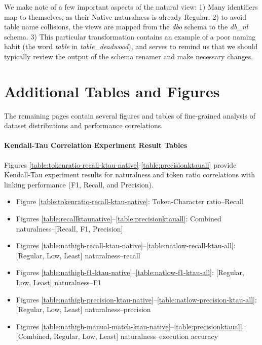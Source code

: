 We make note of a few important aspects of the natural view: 1) Many identifiers map to themselves, as their Native naturalness is already Regular. 2) to avoid table name collisions, the views are mapped from the \emph{dbo} schema to the \emph{db\_nl} schema. 3) This particular transformation contains an example of a poor naming habit (the word \emph{table} in \emph{table\_deadwood}), and serves to remind us that we should typically review the output of the schema renamer and make necessary changes.


\section{Additional Tables and Figures}


The remaining pages contain several figures and tables of fine-grained analysis of dataset distributions and performance correlations.

\paragraph{Kendall-Tau Correlation Experiment Result Tables}

Figures \ref{table:tokenratio-recall-ktau-native}-\ref{table:precisionktauall} provide Kendall-Tau experiment results for naturalness and token ratio correlations with linking performance (F1, Recall, and Precision).

\begin{itemize}
  \item Figure \ref{table:tokenratio-recall-ktau-native}: Token-Character ratio--Recall
  \item Figures \ref{table:recallktaunative}--\ref{table:precisionktauall}: Combined naturalness--[Recall, F1, Precision]
  \item Figures \ref{table:nathigh-recall-ktau-native}--\ref{table:natlow-recall-ktau-all}: [Regular, Low, Least] naturalness--recall
  \item Figures \ref{table:nathigh-f1-ktau-native}--\ref{table:natlow-f1-ktau-all}: [Regular, Low, Least] naturalness--F1
  \item Figures \ref{table:nathigh-precision-ktau-native}--\ref{table:natlow-precision-ktau-all}: [Regular, Low, Least] naturalness--precision
  \item Figures \ref{table:nathigh-manual-match-ktau-native}--\ref{table:precisionktauall}: [Combined, Regular, Low, Least] naturalness--execution accuracy
\end{itemize}

